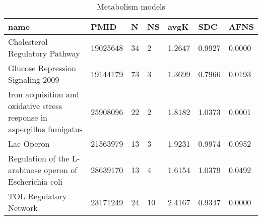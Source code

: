 \begin{table}
\centering
\caption{Metabolism models}
\label{tab:Metabolism}
\begin{tabular}{|p{180pt}||p{40pt}|p{25pt}|p{25pt}|p{40pt}|p{25pt}|p{25pt}|}
\toprule
name & PMID &N &NS & avgK &SDC & AFNS \\
\midrule
Cholesterol Regulatory Pathway & 19025648 & 34 & 2 & 1.2647 & 0.9927 & 0.0000 \\
Glucose Repression Signaling 2009 & 19144179 & 73 & 3 & 1.3699 & 0.7966 & 0.0193 \\
Iron acquisition and oxidative stress response in aspergillus fumigatus & 25908096 & 22 & 2 & 1.8182 & 1.0373 & 0.0001 \\
Lac Operon & 21563979 & 13 & 3 & 1.9231 & 0.9974 & 0.0952 \\
Regulation of the L-arabinose operon of Escherichia coli & 28639170 & 13 & 4 & 1.6154 & 1.0379 & 0.0492 \\
TOL Regulatory Network & 23171249 & 24 & 10 & 2.4167 & 0.9347 & 0.0000 \\
\bottomrule
\end{tabular}
\end{table}
